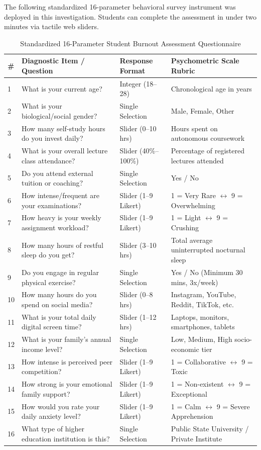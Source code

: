 \documentclass[12pt,a4paper,oneside]{report}
\begin{document}
The following standardized 16-parameter behavioral survey instrument was deployed in this investigation. Students can complete the assessment in under two minutes via tactile web sliders.

\begin{table}[H]
\centering
\caption{Standardized 16-Parameter Student Burnout Assessment Questionnaire}
\label{tab:questionnaire_instrument}
\small
\begin{tabularx}{\textwidth}{lp{4.5cm}p{3.0cm}X}
\toprule
\textbf{\#} & \textbf{Diagnostic Item / Question} & \textbf{Response Format} & \textbf{Psychometric Scale Rubric} \\
\midrule
1 & What is your current age? & Integer (18--28) & Chronological age in years \\
2 & What is your biological/social gender? & Single Selection & Male, Female, Other \\
3 & How many self-study hours do you invest daily? & Slider (0--10 hrs) & Hours spent on autonomous coursework \\
4 & What is your overall lecture class attendance? & Slider (40\%--100\%) & Percentage of registered lectures attended \\
5 & Do you attend external tuition or coaching? & Single Selection & Yes / No \\
6 & How intense/frequent are your examinations? & Slider (1--9 Likert) & 1 = Very Rare $\longleftrightarrow$ 9 = Overwhelming \\
7 & How heavy is your weekly assignment workload? & Slider (1--9 Likert) & 1 = Light $\longleftrightarrow$ 9 = Crushing \\
8 & How many hours of restful sleep do you get? & Slider (3--10 hrs) & Total average uninterrupted nocturnal sleep \\
9 & Do you engage in regular physical exercise? & Single Selection & Yes / No (Minimum 30 mins, 3x/week) \\
10 & How many hours do you spend on social media? & Slider (0--8 hrs) & Instagram, YouTube, Reddit, TikTok, etc. \\
11 & What is your total daily digital screen time? & Slider (1--12 hrs) & Laptops, monitors, smartphones, tablets \\
12 & What is your family's annual income level? & Single Selection & Low, Medium, High socio-economic tier \\
13 & How intense is perceived peer competition? & Slider (1--9 Likert) & 1 = Collaborative $\longleftrightarrow$ 9 = Toxic \\
14 & How strong is your emotional family support? & Slider (1--9 Likert) & 1 = Non-existent $\longleftrightarrow$ 9 = Exceptional \\
15 & How would you rate your daily anxiety level? & Slider (1--9 Likert) & 1 = Calm $\longleftrightarrow$ 9 = Severe Apprehension \\
16 & What type of higher education institution is this? & Single Selection & Public State University / Private Institute \\
\bottomrule
\end{tabularx}
\end{table}
\end{document}
